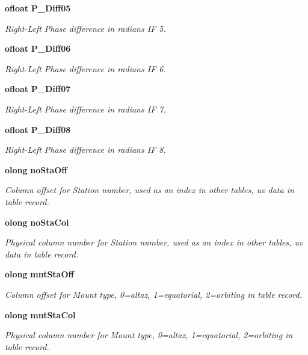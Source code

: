 \begin{CompactItemize}
{\bf ofloat} {\bf P\_\-Diff05}
\begin{CompactList}\small\item\em Right-Left Phase difference in radians IF 5. \item\end{CompactList}\item 
{\bf ofloat} {\bf P\_\-Diff06}
\begin{CompactList}\small\item\em Right-Left Phase difference in radians IF 6. \item\end{CompactList}\item 
{\bf ofloat} {\bf P\_\-Diff07}
\begin{CompactList}\small\item\em Right-Left Phase difference in radians IF 7. \item\end{CompactList}\item 
{\bf ofloat} {\bf P\_\-Diff08}
\begin{CompactList}\small\item\em Right-Left Phase difference in radians IF 8. \item\end{CompactList}\item 
{\bf olong} {\bf no\-Sta\-Off}
\begin{CompactList}\small\item\em Column offset for Station number, used as an index in other tables, uv data in table record. \item\end{CompactList}\item 
{\bf olong} {\bf no\-Sta\-Col}
\begin{CompactList}\small\item\em Physical column number for Station number, used as an index in other tables, uv data in table record. \item\end{CompactList}\item 
{\bf olong} {\bf mnt\-Sta\-Off}
\begin{CompactList}\small\item\em Column offset for Mount type, 0=altaz, 1=equatorial, 2=orbiting in table record. \item\end{CompactList}\item 
{\bf olong} {\bf mnt\-Sta\-Col}
\begin{CompactList}\small\item\em Physical column number for Mount type, 0=altaz, 1=equatorial, 2=orbiting in table record. \item\end{CompactList}\item 

\end{CompactItemize}
